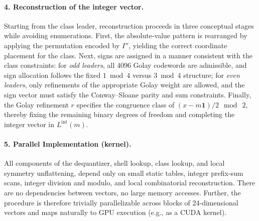 \documentclass{article}
\theoremstyle{plain}
\theoremstyle{definition}
\theoremstyle{remark}
\begin{document}
\paragraph{4. Reconstruction of the integer vector.}
Starting from the class leader, reconstruction proceeds in three conceptual stages while avoiding enumerations. First, the absolute-value pattern is rearranged by applying the permutation encoded by $I''$, yielding the correct coordinate placement for the class. Next, signs are assigned in a manner consistent with the class constraints: for \emph{odd leaders}, all $4096$ Golay codewords are admissible, and sign allocation follows the fixed $1 \bmod 4$ versus $3 \bmod 4$ structure; for \emph{even leaders}, only refinements of the appropriate Golay weight are allowed, and the sign vector must satisfy the Conway--Sloane parity and sum constraints. Finally, the Golay refinement $r$ specifies the congruence class of
$(x - m\mathbf{1})/2 \ \bmod\ 2,$
thereby fixing the remaining binary degrees of freedom and completing the integer vector in $L^{\mathrm{int}}(m)$. %
\vspace{-6pt}
\paragraph{5. Parallel Implementation (kernel).}
All components of the dequantizer, shell lookup, class lookup, and local symmetry unflattening, depend only on small static tables, integer prefix-sum scans, integer division and modulo, and local combinatorial reconstruction. There are no dependencies between vectors, no large memory accesses. Further, the procedure is therefore trivially parallelizable across blocks of 24-dimensional vectors and maps naturally to GPU execution (e.g., as a CUDA kernel).
\end{document}
